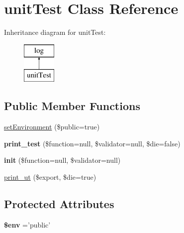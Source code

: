\hypertarget{classunit_test}{\section{unit\-Test Class Reference}
\label{classunit_test}
}
Inheritance diagram for unit\-Test\-:\begin{figure}[H]
\begin{center}
\leavevmode
\includegraphics[height=2.000000cm]{classunit_test}
\end{center}
\end{figure}
\subsection*{Public Member Functions}
\begin{DoxyCompactItemize}
\item 
\hyperlink{classunit_test_a87d56f544f853dec06cbd953c3ede752}{set\-Environment} (\$public=true)
\item 
\hypertarget{classunit_test_a2f7869c20ba14e4ccc0b4a70747626e7}{{\bfseries print\-\_\-test} (\$function=null, \$validator=null, \$die=false)}\label{classunit_test_a2f7869c20ba14e4ccc0b4a70747626e7}

\item 
\hypertarget{classunit_test_ae333c4e62083e087bce97578113b2b17}{{\bfseries init} (\$function=null, \$validator=null)}\label{classunit_test_ae333c4e62083e087bce97578113b2b17}

\item 
\hyperlink{classunit_test_a558679772c5cec30a0bb089041a0f430}{print\-\_\-ut} (\$export, \$die=true)
\end{DoxyCompactItemize}
\subsection*{Protected Attributes}
\begin{DoxyCompactItemize}
\item 
\hypertarget{classunit_test_aa99ce9ae015e958eef5782267276fbb4}{{\bfseries \$env} ='public'}\label{classunit_test_aa99ce9ae015e958eef5782267276fbb4}

\end{DoxyCompactItemize}


